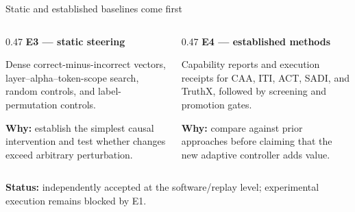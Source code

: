 \documentclass[aspectratio=169,11pt]{beamer}
\begin{document}
\begin{frame}{Static and established baselines come first}
  \small
  \begin{columns}[T,onlytextwidth]
    \begin{column}{0.47\textwidth}
      \textbf{E3 --- static steering}\par\vspace{0.12cm}
      Dense correct-minus-incorrect vectors, layer--alpha--token-scope search, random controls, and label-permutation controls.\par\vspace{0.25cm}
      \textbf{Why:} establish the simplest causal intervention and test whether changes exceed arbitrary perturbation.
    \end{column}
    \begin{column}{0.47\textwidth}
      \textbf{E4 --- established methods}\par\vspace{0.12cm}
      Capability reports and execution receipts for CAA, ITI, ACT, SADI, and TruthX, followed by screening and promotion gates.\par\vspace{0.25cm}
      \textbf{Why:} compare against prior approaches before claiming that the new adaptive controller adds value.
    \end{column}
  \end{columns}
  \vspace{0.3cm}
  {\footnotesize\color{Muted}\textbf{Status:} independently accepted at the software/replay level; experimental execution remains blocked by E1.}
\end{frame}
\end{document}
